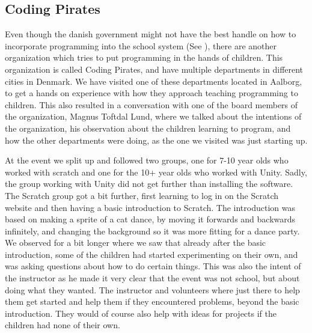 \subsection{Coding Pirates}
\label{sec:coding_pirates}
Even though the danish government might not have the best handle on how to incorporate programming into the school system (See ), there are another organization which tries to put programming in the hands of children. This organization is called Coding Pirates, and have multiple departments in different cities in Denmark. We have visited one of these departments located in Aalborg, to get a hands on experience with how they approach teaching programming to children. This also resulted in a conversation with one of the board members of the organization, Magnus Toftdal Lund, where we talked about the intentions of the organization, his observation about the children learning to program, and how the other departments were doing, as the one we visited was just starting up.

At the event we split up and followed two groups, one for 7-10 year olds who worked with scratch and one for the 10+ year olds who worked with Unity. Sadly, the group working with Unity did not get further than installing the software. The Scratch group got a bit further, first learning to log in on the Scratch website and then having a basic introduction to Scratch. The introduction was based on making a sprite of a cat dance, by moving it forwards and backwards infinitely, and changing the background so it was more fitting for a dance party. We observed for a bit longer where we saw that already after the basic introduction, some of the children had started experimenting on their own, and was asking questions about how to do certain things. This was also the intent of the instructor as he made it very clear that the event was not school, but about doing what they wanted. The instructor and volunteers where just there to help them get started and help them if they encountered problems, beyond the basic introduction. They would of course also help with ideas for projects if the children had none of their own.

